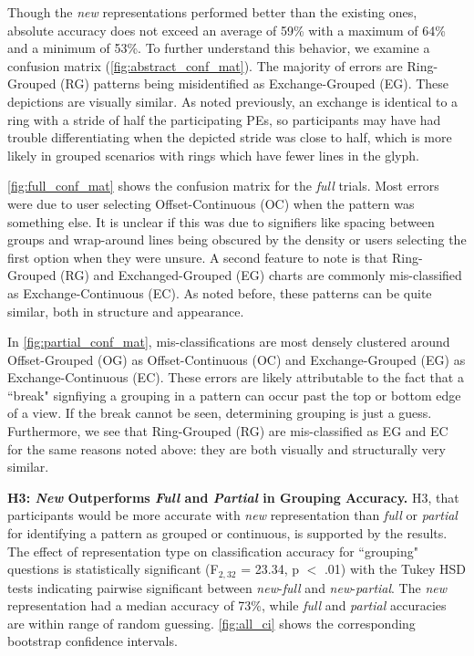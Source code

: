     
    Though the {\em new} representations performed better than the existing ones, absolute accuracy does not exceed an average of 59\% with a maximum of 64\% and a minimum of 53\%. To further understand this behavior, we examine a confusion matrix (\autoref{fig:abstract_conf_mat}). The majority of errors are Ring-Grouped (RG) patterns being misidentified as Exchange-Grouped (EG). These depictions are visually similar. As noted previously, an exchange is identical to a ring with a stride of half the participating PEs, so participants may have had trouble differentiating when the depicted stride was close to half, which is more likely in grouped scenarios with rings which have fewer lines in the glyph.
    
    \autoref{fig:full_conf_mat} shows the confusion matrix for the {\em full} trials. Most errors were due to user selecting Offset-Continuous (OC) when the pattern was something else. It is unclear if this was due to signifiers like spacing between groups and wrap-around lines being obscured by the density or users selecting the first option when they were unsure. A second feature to note is that Ring-Grouped (RG) and Exchanged-Grouped (EG) charts are commonly mis-classified as Exchange-Continuous (EC). As noted before, these patterns can be quite similar, both in structure and appearance.
    
    In \autoref{fig:partial_conf_mat}, mis-classifications are most densely clustered around Offset-Grouped (OG) as Offset-Continuous (OC) and Exchange-Grouped (EG) as Exchange-Continuous (EC). These errors are likely attributable to the fact that a ``break" signfiying a grouping in a pattern can occur past the top or bottom edge of a view. If the break cannot be seen, determining grouping is just a guess. Furthermore, we see that Ring-Grouped (RG) are mis-classified as EG and EC for the same reasons noted above: they are both visually and structurally very similar.

        \vspace{1ex}

\textbf{H3: {\em New} Outperforms {\em Full} and {\em Partial} in Grouping Accuracy.} H3, that participants would be more accurate with {\em new} representation than {\em full} or {\em partial} for identifying a pattern as grouped or continuous, is supported by the results. The effect of representation type on classification accuracy for ``grouping" questions is statistically significant (F$_{2,32}$ = 23.34, p $<$ .01) with the Tukey HSD tests indicating pairwise significant between {\em new}-{\em full} and {\em new}-{\em partial}. The {\em new} representation had a median accuracy of 73\%, while {\em full} and {\em partial} accuracies are within range of random guessing. \autoref{fig:all_ci} shows the corresponding bootstrap confidence intervals.

